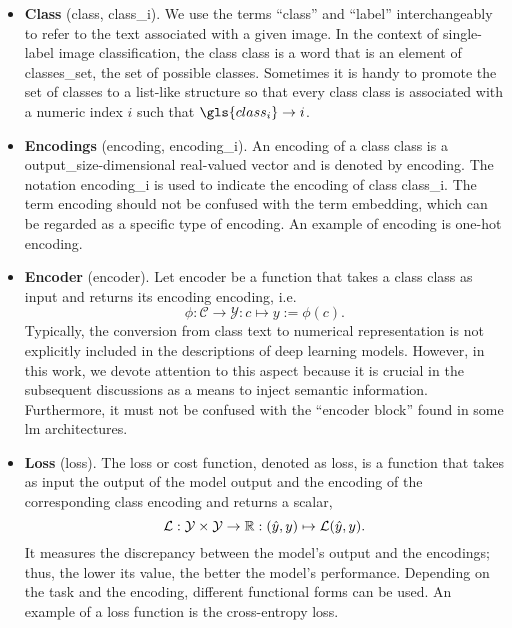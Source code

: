 \begin{itemize}
\item \textbf{Class} (\gls{class}, \gls{class_i}). We use the terms ``class'' and ``label'' interchangeably to refer to the text associated with a given image. In the context of single-label image classification, the class \gls{class} is a word that is an element of \gls{classes_set}, the set of possible classes. Sometimes it is handy to promote the set of classes to a list-like structure so that every class \gls{class} is associated with a numeric index $i$ such that $\gls{class_i} \to i$.

\item \textbf{Encodings} (\gls{encoding}, \gls{encoding_i}). An encoding of a class \gls{class} is a \gls{output_size}-dimensional real-valued vector and is denoted by \gls{encoding}. The notation \gls{encoding_i} is used to indicate the encoding of class \gls{class_i}. The term encoding should not be confused with the term embedding, which can be regarded as a specific type of encoding. An example of encoding is one-hot encoding.

\item \textbf{Encoder} (\gls{encoder}). Let \gls{encoder} be a function that takes a class \gls{class} as input and returns its encoding \gls{encoding}, i.e.\
\begin{equation}
  \phi: \mathcal{C} \to \mathcal{Y} : c \mapsto y := \phi(c).
  \label{eq:encoder}
\end{equation}
Typically, the conversion from class text to numerical representation is not explicitly included in the descriptions of deep learning models. However, in this work, we devote attention to this aspect because it is crucial in the subsequent discussions as a means to inject semantic information. Furthermore, it must not be confused with the ``encoder block'' found in some \acrshort{lm} architectures.

\item \textbf{Loss} (\gls{loss}). The loss or cost function, denoted as \gls{loss}, is a function that takes as input the output of the model \gls{output} and the encoding of the corresponding class \gls{encoding} and returns a scalar,
\begin{equation}
  \operatorname{\mathcal{L}}: \mathcal{Y} \times \mathcal{Y} \to \mathbb{R}
       : (\hat{y}, y) \mapsto \operatorname{\mathcal{L}}(\hat{y}, y).
  \label{eq:loss}
\end{equation}
It measures the discrepancy between the model's output and the encodings; thus, the lower its value, the better the model's performance. Depending on the task and the encoding, different functional forms can be used. An example of a loss function is the cross-entropy loss.

\end{itemize}

